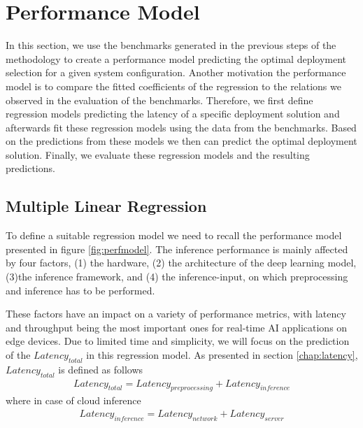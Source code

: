 \section{Performance Model}
\label{chap:perfModel}
In this section, we use the benchmarks generated in the previous steps of the methodology to create a performance model predicting the optimal deployment selection for a given system configuration.
Another motivation the performance model is to compare the fitted coefficients of the regression to the relations we observed in the evaluation of the benchmarks.
Therefore, we first define regression models predicting the latency of a specific deployment solution and afterwards fit these regression models using the data from the benchmarks. Based on the predictions from these models we then can predict the optimal deployment solution.
Finally, we evaluate these regression models and the resulting predictions.



\subsection{Multiple Linear Regression}
To define a suitable regression model we need to recall the performance model presented in figure \ref{fig:perfmodel}.
The inference performance is mainly affected by four factors, (1) the hardware, (2) the architecture of the deep learning model, (3)the inference framework, and (4) the inference-input, on which preprocessing and inference has to be performed.

These factors have an impact on a variety of performance metrics, with latency and throughput being the most important ones for real-time AI applications on edge devices.
Due to limited time and simplicity, we will focus on the prediction of the $Latency_{total}$ in this regression model.
As presented in section \ref{chap:latency}, $Latency_{total}$ is defined as follows
\begin{equation*}
\begin{gathered}
Latency_{total} = Latency_{preprocessing}  + Latency_{inference}
\end{gathered}
\end{equation*}
where in case of cloud inference
\begin{equation*}
\begin{gathered}
Latency_{inference} = Latency_{network}  + Latency_{server}
\end{gathered}
\end{equation*}

